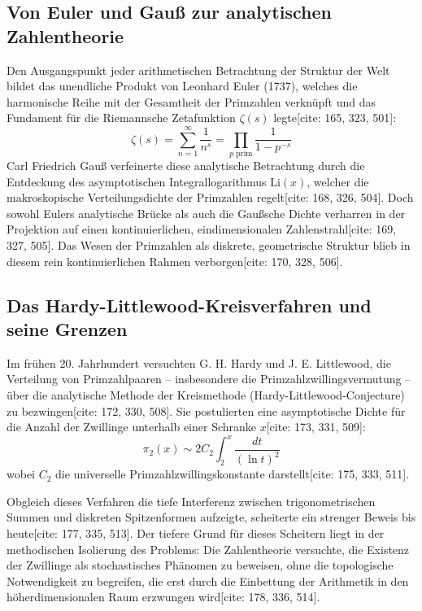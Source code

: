 \documentclass[11pt,a4paper]{article}
\theoremstyle{definition}
\begin{document}
	\subsection{Von Euler und Gauß zur analytischen Zahlentheorie}
	Den Ausgangspunkt jeder arithmetischen Betrachtung der Struktur der Welt bildet das unendliche Produkt von Leonhard Euler (1737), welches die harmonische Reihe mit der Gesamtheit der Primzahlen verknüpft und das Fundament für die Riemannsche Zetafunktion $\zeta(s)$ legte[cite: 165, 323, 501]:
	\begin{equation}
		\zeta(s) = \sum_{n=1}^{\infty} \frac{1}{n^s} = \prod_{p \text{ prim}} \frac{1}{1 - p^{-s}}
	\end{equation}
	Carl Friedrich Gauß verfeinerte diese analytische Betrachtung durch die Entdeckung des asymptotischen Integrallogarithmus $\text{Li}(x)$, welcher die makroskopische Verteilungsdichte der Primzahlen regelt[cite: 168, 326, 504]. Doch sowohl Eulers analytische Brücke als auch die Gaußsche Dichte verharren in der Projektion auf einen kontinuierlichen, eindimensionalen Zahlenstrahl[cite: 169, 327, 505]. Das Wesen der Primzahlen als diskrete, geometrische Struktur blieb in diesem rein kontinuierlichen Rahmen verborgen[cite: 170, 328, 506].
	
	\subsection{Das Hardy-Littlewood-Kreisverfahren und seine Grenzen}
	Im frühen 20. Jahrhundert versuchten G. H. Hardy und J. E. Littlewood, die Verteilung von Primzahlpaaren -- insbesondere die Primzahlzwillingsvermutung -- über die analytische Methode der Kreismethode (Hardy-Littlewood-Conjecture) zu bezwingen[cite: 172, 330, 508]. Sie postulierten eine asymptotische Dichte für die Anzahl der Zwillinge unterhalb einer Schranke $x$[cite: 173, 331, 509]:
	\begin{equation}
		\pi_2(x) \sim 2 C_2 \int_2^x \frac{dt}{(\ln t)^2}
	\end{equation}
	wobei $C_2$ die universelle Primzahlzwillingskonstante darstellt[cite: 175, 333, 511].
	
	Obgleich dieses Verfahren die tiefe Interferenz zwischen trigonometrischen Summen und diskreten Spitzenformen aufzeigte, scheiterte ein strenger Beweis bis heute[cite: 177, 335, 513]. Der tiefere Grund für dieses Scheitern liegt in der methodischen Isolierung des Problems: Die Zahlentheorie versuchte, die Existenz der Zwillinge als stochastisches Phänomen zu beweisen, ohne die topologische Notwendigkeit zu begreifen, die erst durch die Einbettung der Arithmetik in den höherdimensionalen Raum erzwungen wird[cite: 178, 336, 514].
	
\end{document}

